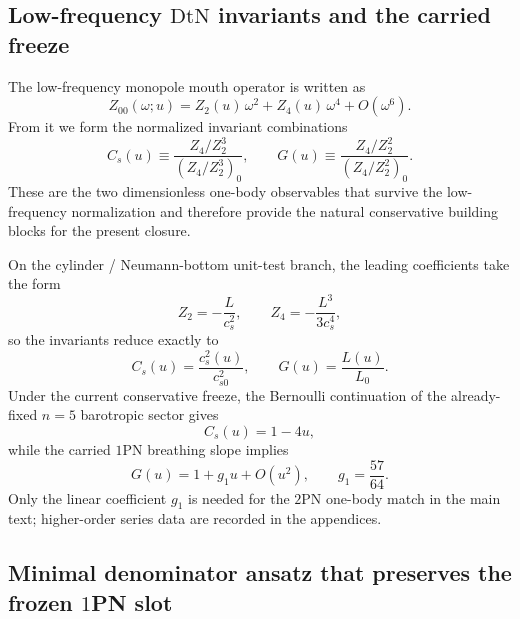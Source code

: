 \documentclass[11pt]{article}
\newcommand{\OnePN}{\mathrm{1PN}}
\newcommand{\TwoPN}{\mathrm{2PN}}
\newcommand{\DtN}{\mathrm{DtN}}
\begin{document}
\subsection{Low-frequency \texorpdfstring{$\DtN$}{DtN} invariants and the carried freeze}
\label{sec:one-body-dtn}

The low-frequency monopole mouth operator is written as
\begin{equation}
Z_{00}(\omega;u)=Z_2(u)\,\omega^2+Z_4(u)\,\omega^4+O(\omega^6).
\label{eq:onebody-mouth-operator}
\end{equation}
From it we form the normalized invariant combinations
\begin{equation}
C_s(u)\equiv \frac{Z_4/Z_2^3}{(Z_4/Z_2^3)_0},
\qquad
G(u)\equiv \frac{Z_4/Z_2^2}{(Z_4/Z_2^2)_0}.
\label{eq:onebody-dtn-invariants}
\end{equation}
These are the two dimensionless one-body observables that survive the low-frequency
normalization and therefore provide the natural conservative building blocks for the
present closure.

On the cylinder / Neumann-bottom unit-test branch, the leading coefficients take the form
\begin{equation}
Z_2=-\frac{L}{c_s^2},
\qquad
Z_4=-\frac{L^3}{3c_s^4},
\label{eq:onebody-cylinder-z2z4}
\end{equation}
so the invariants reduce exactly to
\begin{equation}
C_s(u)=\frac{c_s^2(u)}{c_{s0}^2},
\qquad
G(u)=\frac{L(u)}{L_0}.
\label{eq:onebody-cylinder-invariants}
\end{equation}
Under the current conservative freeze, the Bernoulli continuation of the already-fixed
\(n=5\) barotropic sector gives
\begin{equation}
C_s(u)=1-4u,
\label{eq:onebody-Cs}
\end{equation}
while the carried \(\OnePN\) breathing slope implies
\begin{equation}
G(u)=1+g_1u+O(u^2),
\qquad
g_1=\frac{57}{64}.
\label{eq:onebody-G-slope}
\end{equation}
Only the linear coefficient \(g_1\) is needed for the \(\TwoPN\) one-body match in the
main text; higher-order series data are recorded in the appendices.

\subsection{Minimal denominator ansatz that preserves the frozen \texorpdfstring{$1$}{1}PN slot}
\label{sec:one-body-ansatz}
\end{document}
